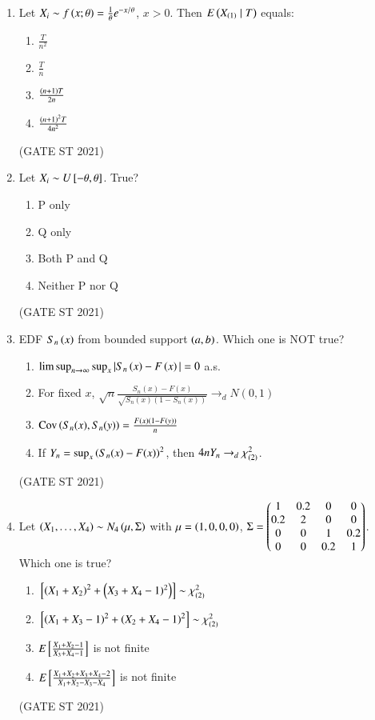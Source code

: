 \documentclass[journal,12pt,onecolumn]{IEEEtran}
\theoremstyle{remark}
\begin{document}
\begin{enumerate}
\item
Let $X_i \sim f\left(x;\theta\right) = \frac{1}{\theta} e^{-x/\theta}$, $x>0$. Then $E\left(X_{\left(1\right)} \mid T\right)$ equals:
\begin{enumerate}
\item $\frac{T}{n^2}$

\item $\frac{T}{n}$
\item $\frac{\left(n+1\right)T}{2n}$
\item $\frac{\left(n+1\right)^2T}{4n^2}$
\end{enumerate}
\hfill (GATE ST 2021) \\

\item
Let $X_i \sim U{}\left[-\theta,\theta\right]$. True?
\begin{enumerate}
\item P only
\item Q only
\item Both P and Q
\item Neither P nor Q
\end{enumerate}
\hfill (GATE ST 2021) \\
\item
EDF $S_n\left(x\right)$ from bounded support $\left(a,b\right)$. Which one is NOT true?
\begin{enumerate}
\item $\limsup_{n\to\infty} \sup_x |S_n\left(x\right)-F\left(x\right)| = 0$ a.s.
\item For fixed $x$, $\sqrt{n}\frac{S_n(x)-F(x)}{\sqrt{S_n(x)(1-S_n(x))}} \to_d N(0,1)$
\item $\text{Cov}\left(S_n(x), S_n(y)\right) = \frac{F\left(x\right)\left(1-F\left(y\right)\right)}{n}$
\item If $Y_n = \sup_x \left(S_n(x)-F(x)\right)^2$, then $4n Y_n \to_d \chi^2_{\left(2\right)}$.
\end{enumerate}
\hfill (GATE ST 2021) \\


\item
Let $\left(X_1,\dots,X_4\right) \sim N_4\left(\mu,\Sigma\right)$ with  
$\mu = \left(1,0,0,0\right)$, $\Sigma = \begin{pmatrix} 1 & 0.2 & 0 & 0 \\ 0.2 & 2 & 0 & 0 \\ 0 & 0 & 1 & 0.2 \\ 0 & 0 & 0.2 & 1 \end{pmatrix}$.  
Which one is true?
\begin{enumerate}
\item ${}\left[\left(X_1+X_2\right)^2 + \left(X_3+X_4-1)^2\right)\right] \sim \chi^2_{(2)}$
\item ${}\left[\left(X_1+X_3-1\right)^2 + \left(X_2+X_4-1\right)^2\right]\sim \chi^2_{(2)}$
\item $E{}\left[\frac{X_1+X_2-1}{X_3+X_4-1}\right]$ is not finite
\item $E{}\left[ \frac{X_1+X_2+X_3+X_4-2}{X_1+X_2-X_3-X_4} \right]$ is not finite
\end{enumerate}
\hfill (GATE ST 2021) \\


\end{enumerate}
\end{document}
